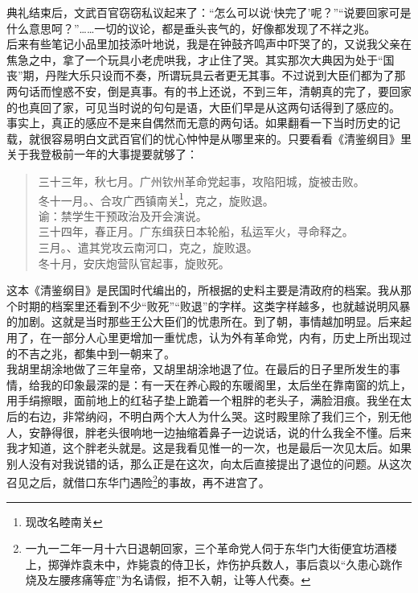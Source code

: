 典礼结束后，文武百官窃窃私议起来了：“怎么可以说‘快完了’呢？”“说要回家可是什么意思呵？”……一切的议论，都是垂头丧气的，好像都发现了不祥之兆。\\

后来有些笔记小品里加技添叶地说，我是在钟鼓齐鸣声中吓哭了的，又说我父亲在焦急之中，拿了一个玩具小老虎哄我，才止住了哭。其实那次大典因为处于“国丧”期，丹陛大乐只设而不奏，所谓玩具云者更无其事。不过说到大臣们都为了那两句话而惶惑不安，倒是真事。有的书上还说，不到三年，清朝真的完了，要回家的也真回了家，可见当时说的句句是语，大臣们早是从这两句话得到了感应的。\\

事实上，真正的感应不是来自偶然而无意的两句话。如果翻看一下当时历史的记载，就很容易明白文武百官们的忧心忡忡是从哪里来的。只要看看《清鉴纲目》里关于我登极前一年的大事提要就够了：\\

\begin{quote}
	三十三年，秋七月。广州钦州革命党起事，攻陷阳城，旋被击败。\\

冬十一月。、合攻广西镇南关\footnote{现改名睦南关}，克之，旋败退。\\

谕：禁学生干预政治及开会演说。\\

三十四年，春正月。广东缉获日本轮船，私运军火，寻命释之。\\

三月。、遣其党攻云南河口，克之，旋败退。\\

冬十月，安庆炮营队官起事，旋败死。\\
\end{quote}

这本《清鉴纲目》是民国时代编出的，所根据的史料主要是清政府的档案。我从那个时期的档案里还看到不少“败死”“败退”的字样。这类字样越多，也就越说明风暴的加剧。这就是当时那些王公大臣们的忧患所在。到了朝，事情越加明显。后来起用了，在一部分人心里更增加一重忧虑，认为外有革命党，内有，历史上所出现过的不吉之兆，都集中到一朝来了。\\

我胡里胡涂地做了三年皇帝，又胡里胡涂地退了位。在最后的日子里所发生的事情，给我的印象最深的是：有一天在养心殿的东暖阁里，太后坐在靠南窗的炕上，用手绢擦眼，面前地上的红毡子垫上跪着一个粗胖的老头子，满脸泪痕。我坐在太后的右边，非常纳闷，不明白两个大人为什么哭。这时殿里除了我们三个，别无他人，安静得很，胖老头很响地一边抽缩着鼻子一边说话，说的什么我全不懂。后来我才知道，这个胖老头就是。这是我看见惟一的一次，也是最后一次见太后。如果别人没有对我说错的话，那么正是在这次，向太后直接提出了退位的问题。从这次召见之后，就借口东华门遇险\footnote{一九一二年一月十六日退朝回家，三个革命党人伺于东华门大街便宜坊酒楼上，掷弹炸袁未中，炸毙袁的侍卫长，炸伤护兵数人，事后袁以“久患心跳作烧及左腰疼痛等症”为名请假，拒不入朝，让等人代奏。}的事故，再不进宫了。\\

